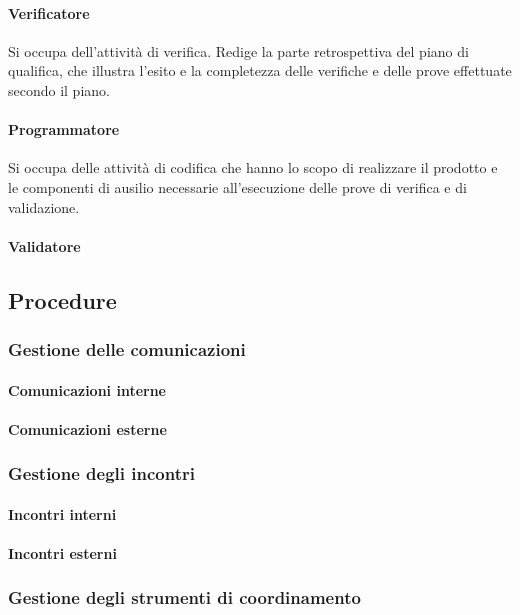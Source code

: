 \paragraph{Verificatore} Si occupa dell'attività di verifica. Redige la parte retrospettiva del piano di qualifica, che illustra l'esito e la completezza delle verifiche e delle prove effettuate secondo il piano. 
\paragraph{Programmatore} Si occupa delle attività di codifica che hanno lo scopo di realizzare il prodotto e le componenti di ausilio necessarie all'esecuzione delle prove di verifica e di validazione. 
\paragraph{Validatore}
\subsection{Procedure}
\subsubsection{Gestione delle comunicazioni}
\paragraph{Comunicazioni interne}
\paragraph{Comunicazioni esterne}
\subsubsection{Gestione degli incontri}
\paragraph{Incontri interni}
\paragraph{Incontri esterni}
\subsubsection{Gestione degli strumenti di coordinamento}